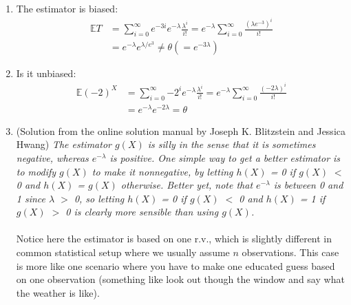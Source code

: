 
\setcounter{theorem}{65}
\begin{exercise} [BH.4.66]
\begin{solution}
    \begin{enumerate}
	    \item The estimator is biased:
    	\begin{align*}
    		\mathbb{E}T &= \sum_{i=0}^{\infty} e^{-3i} e^{-\lambda}\frac{\lambda^i}{i!}= e^{-\lambda} \sum_{i=0}^{\infty}  \frac{\left(\lambda e^{-3} \right)^i}{i!} \\
    		&= e^{-\lambda} e^{\lambda/e^3} \neq \theta (=e^{-3\lambda})
    	\end{align*}
    	\item Is it unbiased:
    	\begin{align*}
    		\mathbb{E}(-2)^X  &= \sum_{i=0}^{\infty} {-2}^i e^{-\lambda}\frac{\lambda^i}{i!}= e^{-\lambda} \sum_{i=0}^{\infty}  \frac{\left(-2\lambda \right)^i}{i!} \\
    		&= e^{-\lambda} e^{-2\lambda} = \theta 
    	\end{align*} 
    	\item (Solution from the online solution manual by Joseph K. Blitzstein and Jessica Hwang) \textit{The estimator $g(X)$ is silly in the sense that it is sometimes negative, whereas $e^{-\lambda}$
    		is positive. One simple way to get a better estimator is to modify $g(X)$ to make it nonnegative, by letting $h(X)$ = 0 if $g(X)$ $<$ 0 and $h(X)$ = $g(X)$ otherwise.
    		Better yet, note that $e^{-\lambda}$ is between 0 and 1 since $\lambda$ $>$ 0, so letting $h(X)$ = 0 if
    		$g(X)$ $<$ 0 and $h(X)$ = 1 if $g(X)$ $>$ 0 is clearly more sensible than using $g(X)$.} \\~\\
    	Notice here the estimator is based on one r.v., which is slightly different in common statistical setup where we usually assume $n$ observations. This case is more like one scenario where you have to make one educated guess based on one observation (something like look out though the window and say what the weather is like). 
	\end{enumerate}
\end{solution}
\end{exercise}

